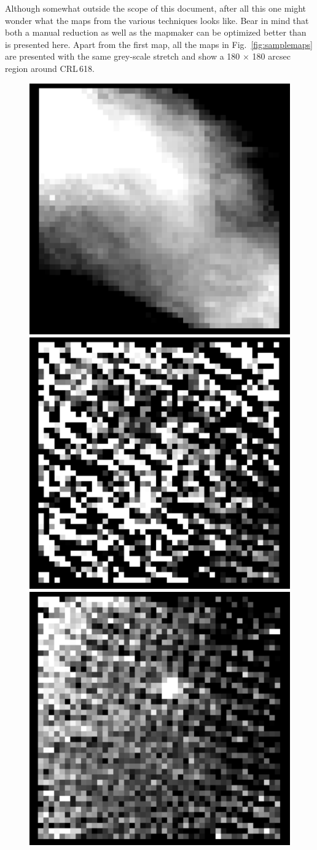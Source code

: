 \documentclass[twoside,11pt]{article}
\renewcommand{\_}{\texttt{\symbol{95}}}
\begin{document}
Although somewhat outside the scope of this document, after all this
one might wonder what the maps from the various techniques looks like.
Bear in mind that both a manual reduction as well as the mapmaker can
be optimized better than is presented here. Apart from the first map,
all the maps in Fig.\ \ref{fig:samplemaps} are presented with the same
grey-scale stretch and show a 180 $\times$ 180 arcsec region around
CRL\,618.

\begin{figure}[ht]
\begin{center}
\includegraphics[width=0.45\linewidth]{sc19_con_smallmap}
\hspace{0.03\linewidth}
\includegraphics[width=0.45\linewidth]{sc19_conbsl_smallmap}
\includegraphics[width=0.45\linewidth]{sc19_concln_smallmap}
\hspace{0.03\linewidth}

\end{center}
\end{figure}
\end{document}
